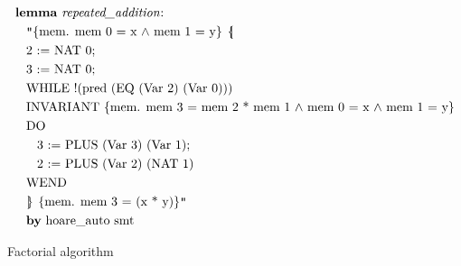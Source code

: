 \documentclass{llncs}
\newcommand{\llbrace}{\hspace{1pt} \lbrace \kern -3pt \vert \hspace{1pt}}
\newcommand{\rrbrace}{\hspace{0.5pt} \rbrace \kern -5pt \vert \hspace{3pt}}
\begin{document}
\begin{minipage}[T]{0.1\textwidth}
{
\begin{align*}
&\text{\textbf{lemma} \textit{repeated\_addition}:}\\
&\hspace{2ex}\text{\texttt{"}\{mem. mem 0 = x $\wedge$ mem 1 = y\} $\llbrace$}\\
&\hspace{2ex}\text{2 := NAT 0;}\\
&\hspace{2ex}\text{3 := NAT 0;}\\
&\hspace{2ex}\text{WHILE !(pred (EQ (Var 2) (Var 0)))}\\
&\hspace{2ex}\text{INVARIANT \{mem. mem 3 = mem 2 * mem 1 $\wedge$ mem 0 = x $\wedge$ mem 1 = y\}}\\
&\hspace{2ex}\text{DO}\\
&\hspace{4ex}\text{3 := PLUS (Var 3) (Var 1);}\\
&\hspace{4ex}\text{2 := PLUS (Var 2) (NAT 1)}\\
&\hspace{2ex}\text{WEND}\\
&\hspace{2ex}\text{$\rrbrace$ \{mem. mem 3 = (x * y)\}\texttt{"}}\\
&\hspace{2ex}\text{\textbf{by} hoare\_auto smt}
\end{align*}
}
\end{minipage}

Factorial algorithm
\end{document}
